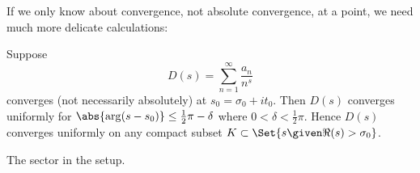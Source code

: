 If we only know about convergence, not absolute convergence, at a point, we need much more delicate calculations:

\begin{proposition}\label{prop12.2}
	Suppose
	\[
		D(s) = \sum_{n = 1}^\infty \frac{a_n}{n^s}
	\]
	converges (not necessarily absolutely) at $s_0 = \sigma_0 + i t_0$.
	Then $D(s)$ converges uniformly for $\abs{\arg(s - s_0)} \leq \frac{1}{2} \pi - \delta$ where $0 < \delta < \frac{1}{2} \pi$.
	Hence $D(s)$ converges uniformly on any compact subset $K \subset \Set{s \given \Re(s) > \sigma_0}$.
\end{proposition}

\begin{marginfigure}
	\centering

	\caption{\label{l29:fig12.2a} The sector in the setup.}
\end{marginfigure}

